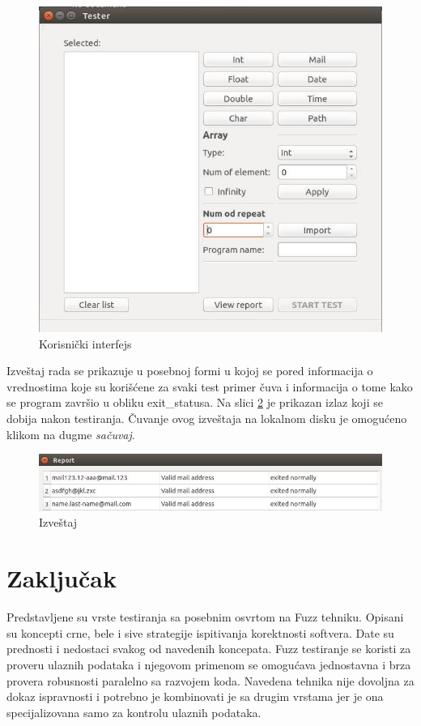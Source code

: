 \documentclass[a4paper]{article}
\begin{document}
{\begin{figure}[h!]
\begin{center}
\includegraphics[scale=0.5]{korisnicki_interfejs.jpg}
\end{center}
\caption{Korisnički interfejs}
\label{fig:interfejs}
\end{figure}

Izveštaj rada se prikazuje u posebnoj formi u kojoj se pored informacija o vrednostima koje su korišćene za svaki test primer čuva i informacija o tome kako se program završio u obliku exit\_statusa. Na slici \ref{fig:izvestaj} je prikazan izlaz koji se dobija nakon testiranja. Čuvanje ovog izveštaja na lokalnom disku je omogućeno klikom na dugme \textit{sačuvaj}.
\begin{figure}[h!]
\begin{center}
\includegraphics[scale=0.4]{izvestaj.jpg}
\end{center}
\caption{Izveštaj}
\label{fig:izvestaj}
\end{figure}

\section{Zaključak}
\label{sec:zakljucak}
Predstavljene su vrste testiranja sa posebnim osvrtom na Fuzz tehniku. Opisani su koncepti crne, bele i sive strategije ispitivanja korektnosti softvera. Date su prednosti i nedostaci svakog od navedenih koncepata. Fuzz testiranje se koristi za proveru ulaznih podataka i njegovom primenom se omogućava jednostavna i brza provera robusnosti paralelno sa razvojem koda. Navedena tehnika nije dovoljna za dokaz ispravnosti i potrebno je kombinovati je sa drugim vrstama jer je ona specijalizovana samo za kontrolu ulaznih podataka. \\

}
\end{document}
